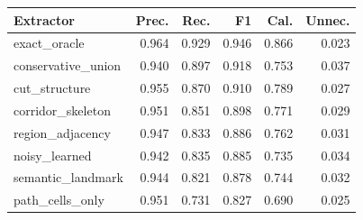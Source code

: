\begin{tabular}{lrrrrr}
\toprule
Extractor & Prec. & Rec. & F1 & Cal. & Unnec. \\
\midrule
exact\_oracle & 0.964 & 0.929 & 0.946 & 0.866 & 0.023 \\
conservative\_union & 0.940 & 0.897 & 0.918 & 0.753 & 0.037 \\
cut\_structure & 0.955 & 0.870 & 0.910 & 0.789 & 0.027 \\
corridor\_skeleton & 0.951 & 0.851 & 0.898 & 0.771 & 0.029 \\
region\_adjacency & 0.947 & 0.833 & 0.886 & 0.762 & 0.031 \\
noisy\_learned & 0.942 & 0.835 & 0.885 & 0.735 & 0.034 \\
semantic\_landmark & 0.944 & 0.821 & 0.878 & 0.744 & 0.032 \\
path\_cells\_only & 0.951 & 0.731 & 0.827 & 0.690 & 0.025 \\
\bottomrule
\end{tabular}
